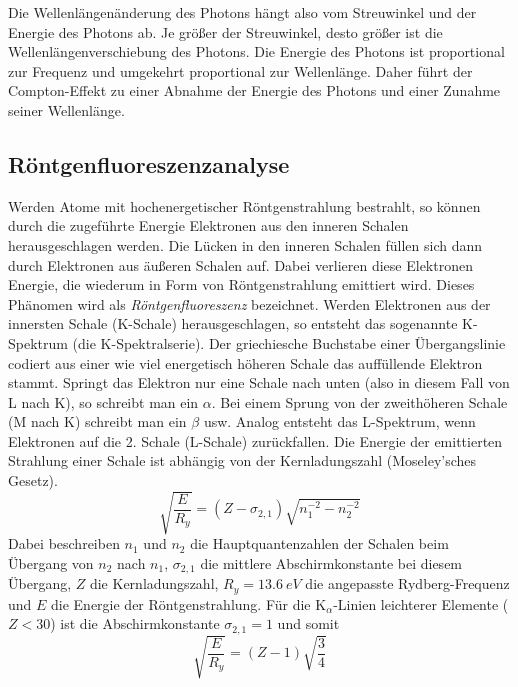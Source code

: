 \documentclass[ngerman]{scrartcl}
\begin{document}
Die Wellenlängenänderung des Photons hängt also vom Streuwinkel und der Energie des Photons ab. Je größer der Streuwinkel, desto größer ist die Wellenlängenverschiebung des Photons. Die Energie des Photons ist proportional zur Frequenz und umgekehrt proportional zur Wellenlänge. Daher führt der Compton-Effekt zu einer Abnahme der Energie des Photons und einer Zunahme seiner Wellenlänge.


\subsection[Röntgenfluoreszenzanalyse]{Röntgenfluoreszenzanalyse \cite{ref:angabe_roentgen}}
\label{sub:grundlagen_roentgen}

Werden Atome mit hochenergetischer Röntgenstrahlung bestrahlt, so können durch die zugeführte
Energie Elektronen aus den inneren Schalen herausgeschlagen werden. Die Lücken in den inneren
Schalen füllen sich dann durch Elektronen aus äußeren Schalen auf. Dabei verlieren diese Elektronen
Energie, die wiederum in Form von Röntgenstrahlung emittiert wird. Dieses Phänomen wird als
\textit{Röntgenfluoreszenz} bezeichnet. Werden Elektronen aus der innersten Schale (K-Schale)
herausgeschlagen, so entsteht das sogenannte K-Spektrum (die K-Spektralserie). Der griechiesche Buchstabe
einer Übergangslinie codiert aus einer wie viel energetisch höheren Schale das auffüllende Elektron stammt.
Springt das Elektron nur eine Schale nach unten (also in diesem Fall von L nach K), so schreibt man ein $\alpha$.
Bei einem Sprung von der zweithöheren Schale (M nach K) schreibt man ein $\beta$ usw.
Analog entsteht das L-Spektrum,
wenn Elektronen auf die 2. Schale (L-Schale) zurückfallen. Die Energie der emittierten Strahlung einer
Schale ist abhängig von der Kernladungszahl (Moseley'sches Gesetz).
\begin{equation}
    \label{eq:moseley}
    \sqrt{\frac{E}{R_y}} = (Z-\sigma_{2,1})\sqrt{n_1^{-2}-n_2^{-2}}
\end{equation}
Dabei beschreiben $n_1$ und $n_2$ die Hauptquantenzahlen der Schalen beim Übergang von $n_2$ nach $n_1$, $\sigma_{2,1}$ die mittlere Abschirmkonstante bei diesem Übergang, $Z$ die Kernladungszahl, $R_y=\SI{13,6}{eV}$ die angepasste Rydberg-Frequenz und $E$ die Energie der Röntgenstrahlung. Für die K$_\alpha$-Linien leichterer Elemente ($Z<30$) ist die Abschirmkonstante $\sigma_{2,1}=1$ und somit
\begin{equation}
    \label{eq:moseley_einfach}
    \sqrt{\frac{E}{R_y}} = (Z-1)\sqrt{\frac{3}{4}}
\end{equation}
\end{document}
